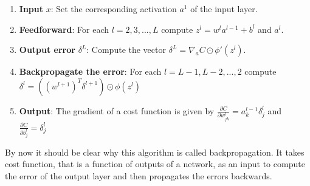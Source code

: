 \begin{enumerate}
    \item \textbf{Input} $x$: Set the corresponding activation $a^1$ of the input layer.
    \item \textbf{Feedforward}: For each $l = 2, 3, ..., L$ compute $z^l = w^la^{l-1}+b^l$ and $a^l$.
    \item \textbf{Output error} $\delta^L$: Compute the vector $\delta^L = \nabla_a C \odot \phi'(z^l)$.
    \item \textbf{Backpropagate the error}: For each $l = L-1, L-2, ..., 2$ compute 
        $\delta^l = \left((w^{l+1})^T \delta^{l+1}\right) \odot \phi(z^l)$
    \item \textbf{Output}: The gradient of a cost function is given by 
        $\frac{\partial C}{\partial w^l_{jk}} = a^{l-1}_k \delta^l_j$ 
        and 
        $\frac{\partial C}{\partial b^l_j} = \delta^l_j$
\end{enumerate}

By now it should be clear why this algorithm is called backpropagation. It takes cost function, that is a function of outputs of a network, as an input to compute the error of the output layer and then propagates the errors backwards.